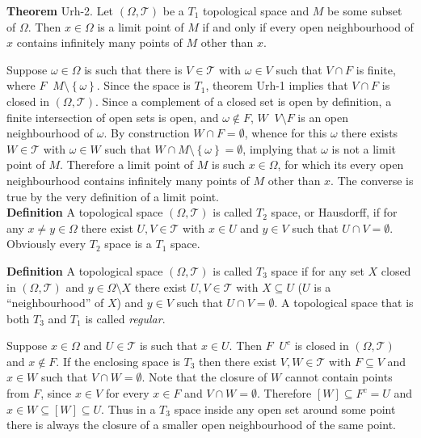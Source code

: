 \documentclass[a4paper]{article}
\newcommand{\obj}[1]{\left\{ #1 \right \}}
\newcommand{\clo}[1]{\left [ #1 \right ]}
\newcommand{\brac}[1]{\left ( #1 \right )}
\newcommand{\Tcal}{\mathcal{T}}
\newcommand{\defn}{\mathop{\overset{\Delta}{=}}\nolimits}
\begin{document}
\label{thm:t1_limit_pt} \noindent \textbf{Theorem} Urh-2.
Let $\brac{\Omega, \Tcal}$ be a $T_1$ topological space and $M$ be some subset of $\Omega$. Then $x\in \Omega$ is a limit point of $M$ if and only if every open neighbourhood of $x$ contains infinitely many points of $M$ other than $x$.

Suppose $\omega\in \Omega$ is such that there is $V\in \Tcal$ with $\omega\in V$ such that $V\cap F$ is finite, where $F\defn M\setminus \obj{\omega}$. Since the space is $T_1$, theorem Urh-1 implies that $V\cap F$ is closed in $\brac{\Omega,\Tcal}$. Since a complement of a closed set is open by definition, a finite intersection of open sets is open, and $\omega\notin F$, $W\defn V\setminus F$ is an open neighbourhood of $\omega$. By construction $W\cap F=\emptyset$, whence for this $\omega$ there exists $W\in \Tcal$ with $\omega\in W$ such that $W\cap M\setminus \obj{\omega} = \emptyset$, implying that $\omega$ is not a limit point of $M$. Therefore a limit point of $M$ is such $x\in \Omega$, for which its every open neighbourhood contains infinitely many points of $M$ other than $x$. The converse is true by the very definition of a limit point.\\

\noindent \textbf{Definition}
A topological space $\brac{\Omega, \Tcal}$ is called $T_2$ space, or Hausdorff, if for any $x\neq y\in \Omega$ there exist $U,V\in \Tcal$ with $x\in U$ and $y\in V$ such that $U\cap V = \emptyset$. Obviously every $T_2$ space is a $T_1$ space.

\noindent \textbf{Definition}
A topological space $\brac{\Omega, \Tcal}$ is called $T_3$ space if for any set $X$ closed in $\brac{\Omega, \Tcal}$ and $y\in \Omega \setminus X$ there exist $U,V\in \Tcal$ with $X\subseteq U$ ($U$ is a ``neighbourhood'' of $X$) and $y\in V$ such that $U\cap V = \emptyset$. A topological space that is both $T_3$ and $T_1$ is called \emph{regular}.

Suppose $x\in \Omega$ and $U\in \Tcal$ is such that $x\in U$. Then $F\defn U^c$ is closed in $\brac{\Omega,\Tcal}$ and $x\notin F$. If the enclosing space is $T_3$ then there exist $V,W\in \Tcal$ with $F\subseteq V$ and $x\in W$ such that $V\cap W = \emptyset$. Note that the closure of $W$ cannot contain points from $F$, since $x\in V$ for every $x\in F$ and $V\cap W = \emptyset$. Therefore $\clo{W}\subseteq F^c = U$ and $x\in W\subseteq \clo{W}\subseteq U$. Thus in a $T_3$ space inside any open set around some point there is always the closure of a smaller open neighbourhood of the same point.
\end{document}
